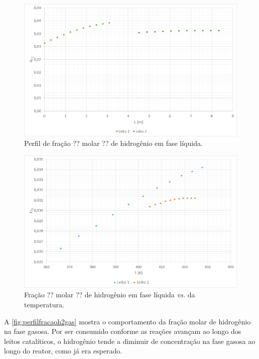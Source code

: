 \begin{figure}[htb]
\centering \includegraphics[scale=0.4]{images/Chap4/perfilfracaoh2liquido.png}
\caption{Perfil de fração ?? molar ?? de hidrogênio em fase líquida.}
\label{fig:perfilfracaoh2liquido}
\end{figure}

\begin{figure}[htb]
\centering
\includegraphics[scale=0.4]{images/Chap4/perfilfracaoh2temperatura.png}
\caption{Fração ?? molar ?? de hidrogênio em fase líquida \emph{vs.} da temperatura.}
\label{fig:perfilfracaoh2temperatura}
\end{figure}

A \autoref{fig:perfilfracaoh2gas} mostra o comportamento da
fração molar de hidrogênio na fase gasosa. Por ser consumido conforme as reações
avançam ao longo dos leitos catalíticos, o hidrogênio tende a diminuir de
concentração na fase gasosa ao longo do reator, como já era esperado.

